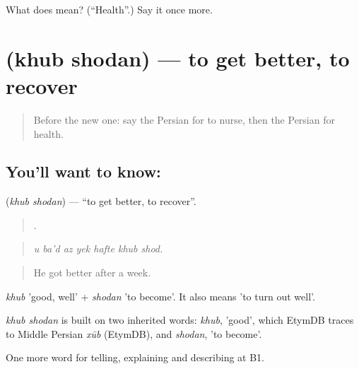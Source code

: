 \begin{tcolorbox}[breakable,colback=teal!4,colframe=teal!35!black,title={Before you move on}]
What does  mean? (\textquotedblleft{}Health\textquotedblright{}.) Say it once more.
\end{tcolorbox}
\section[\texorpdfstring{\fa{خوب} \fa{شدن} (khub shodan)}{خوب شدن (khub shodan)}]{  (khub shodan) — to get better, to recover}

\label{lesson:FA-C494-khub-shodan}



\begin{quote}
Before the new one: say the Persian for to nurse, then the Persian for health.
\end{quote}

\subsection*{You'll want to know:  }
\textbf{ } (\emph{khub shodan}) — \textquotedblleft{}to get better, to recover\textquotedblright{}.

\begin{quote}
      .
\end{quote}

\begin{quote}
\emph{u ba'd az yek hafte khub shod.}
\end{quote}

\begin{quote}
He got better after a week.
\end{quote}

\emph{khub} 'good, well' + \emph{shodan} 'to become'. It also means 'to turn out well'.

\begin{cousinweb}
\emph{khub shodan} is built on two inherited words: \emph{khub}, 'good', which EtymDB traces to Middle Persian \emph{xūb} (EtymDB), and \emph{shodan}, 'to become'.
\end{cousinweb}

\begin{grammarlens}[title={What you've built}]
One more word for telling, explaining and describing at B1.
\end{grammarlens}

